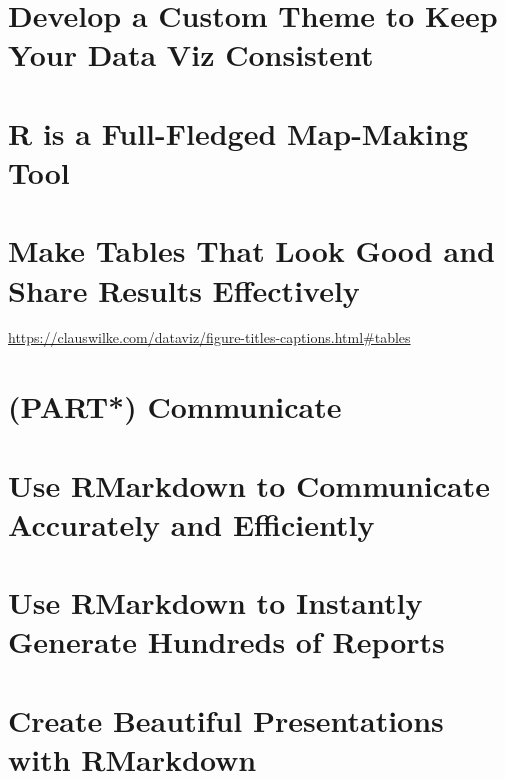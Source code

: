 \documentclass[
]{book}
\begin{document}
\hypertarget{develop-a-custom-theme-to-keep-your-data-viz-consistent}{%
\chapter{Develop a Custom Theme to Keep Your Data Viz Consistent}\label{develop-a-custom-theme-to-keep-your-data-viz-consistent}}

\hypertarget{r-is-a-full-fledged-map-making-tool}{%
\chapter{R is a Full-Fledged Map-Making Tool}\label{r-is-a-full-fledged-map-making-tool}}

\hypertarget{make-tables-that-look-good-and-share-results-effectively}{%
\chapter{Make Tables That Look Good and Share Results Effectively}\label{make-tables-that-look-good-and-share-results-effectively}}

\url{https://clauswilke.com/dataviz/figure-titles-captions.html\#tables}

\hypertarget{part-communicate}{%
\chapter{(PART*) Communicate}\label{part-communicate}}

\hypertarget{use-rmarkdown-to-communicate-accurately-and-efficiently}{%
\chapter{Use RMarkdown to Communicate Accurately and Efficiently}\label{use-rmarkdown-to-communicate-accurately-and-efficiently}}

\hypertarget{use-rmarkdown-to-instantly-generate-hundreds-of-reports}{%
\chapter{Use RMarkdown to Instantly Generate Hundreds of Reports}\label{use-rmarkdown-to-instantly-generate-hundreds-of-reports}}

\hypertarget{create-beautiful-presentations-with-rmarkdown}{%
\chapter{Create Beautiful Presentations with RMarkdown}\label{create-beautiful-presentations-with-rmarkdown}}
\end{document}
